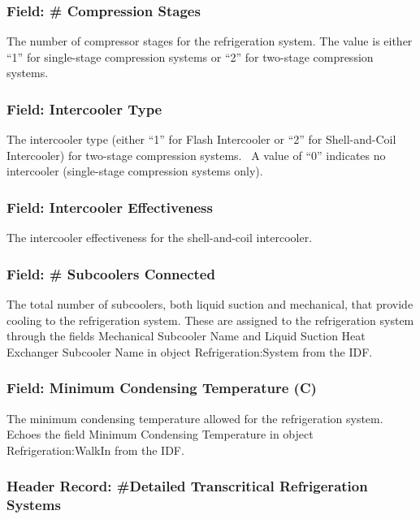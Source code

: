 \subsubsection{Field: \# Compression Stages}\label{field-compression-stages}

The number of compressor stages for the refrigeration system. The value is either ``1'' for single-stage compression systems or ``2'' for two-stage compression systems.

\subsubsection{Field: Intercooler Type}\label{field-intercooler-type}

The intercooler type (either ``1'' for Flash Intercooler or ``2'' for Shell-and-Coil Intercooler) for two-stage compression systems.~ A value of ``0'' indicates no intercooler (single-stage compression systems only).

\subsubsection{Field: Intercooler Effectiveness}\label{field-intercooler-effectiveness}

The intercooler effectiveness for the shell-and-coil intercooler.

\subsubsection{Field: \# Subcoolers Connected}\label{field-subcoolers-connected}

The total number of subcoolers, both liquid suction and mechanical, that provide cooling to the refrigeration system. These are assigned to the refrigeration system through the fields Mechanical Subcooler Name and Liquid Suction Heat Exchanger Subcooler Name in object Refrigeration:System from the IDF.

\subsubsection{Field: Minimum Condensing Temperature (C)}\label{field-minimum-condensing-temperature-c}

The minimum condensing temperature allowed for the refrigeration system. Echoes the field Minimum Condensing Temperature in object Refrigeration:WalkIn from the IDF.

\subsubsection{Header Record: \#Detailed Transcritical Refrigeration Systems}\label{header-record-detailed-transcritical-refrigeration-systems}

